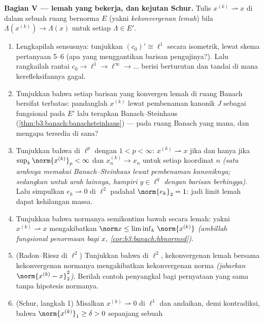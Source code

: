 \begin{problem}[{Soal akhir pekan --- $(\ell^p)' = \ell^q$,
kerefleksifan, dan keanehan $\ell^\infty$}]
\medskip
\noindent\textbf{Bagian V ---  lemah yang bekerja, dan
kejutan Schur.} Tulis $x^{(k)} \rightharpoonup x$ di dalam sebuah
ruang bernorma $E$ (yakni \emph{kekonvergenan lemah}) bila
$\Lambda(x^{(k)}) \to \Lambda(x)$ untuk setiap $\Lambda \in E'$.
\begin{enumerate}[resume]
  \item Lengkapilah sensusnya: tunjukkan $(c_0)' \cong \ell^1$
        secara isometrik, lewat skema pertanyaan 5--6 (apa yang
        menggantikan barisan pengujinya?). Lalu rangkailah rantai
        $c_0 \to \ell^1 \to \ell^\infty \to \dots$ berisi 
        berturutan dan tandai di mana kerefleksifannya gagal.
  \item Tunjukkan bahwa setiap barisan yang konvergen lemah di ruang Banach
        bersifat terbatas: pandanglah $x^{(k)}$ lewat
        pembenaman kanonik $J$ sebagai fungsional pada $E'$ lalu
        terapkan Banach--Steinhaus
        (\cref{thm:b3:banach:banachsteinhaus}) --- pada ruang
        Banach yang mana, dan mengapa  tersedia di sana?
  \item Tunjukkan bahwa di $\ell^p$ dengan $1 < p < \infty$: $x^{(k)}
        \rightharpoonup x$ jika dan hanya jika $\sup_k\norm{x^{(k)}}_p <
        \infty$ dan $x^{(k)}_n \to x_n$ untuk setiap koordinat
        $n$ \emph{(satu arahnya memakai Banach--Steinhaus lewat
        pembenaman kanoniknya; sedangkan untuk arah lainnya, hampiri $y
        \in \ell^q$ dengan barisan berhingga)}. Lalu simpulkan $e_k
        \rightharpoonup 0$ di $\ell^2$ padahal $\norm{e_k}_2 =
        1$: jadi limit lemah dapat kehilangan massa.
  \item Tunjukkan bahwa normanya semikontinu bawah secara lemah:
        yakni $x^{(k)} \rightharpoonup x$ mengakibatkan $\norm x \leq
        \liminf_k\,\norm{x^{(k)}}$ \emph{(ambillah fungsional
        penormaan bagi $x$, \cref{cor:b3:banach:hbnormed})}.
  \item (Radon--Riesz di $\ell^2$) Tunjukkan bahwa di $\ell^2$, kekonvergenan
        lemah bersama kekonvergenan normanya mengakibatkan kekonvergenan
        norma \emph{(jabarkan $\norm{x^{(k)} -
        x}_2^2$)}. Berilah contoh penyangkal bagi pernyataan yang sama
        tanpa hipotesis normanya.
  \item (Schur, langkah 1) Misalkan $x^{(k)} \rightharpoonup 0$ di
        $\ell^1$ dan andaikan, demi kontradiksi, bahwa
        $\norm{x^{(k)}}_1 \geq \delta > 0$ sepanjang sebuah

\end{enumerate}
\end{problem}
